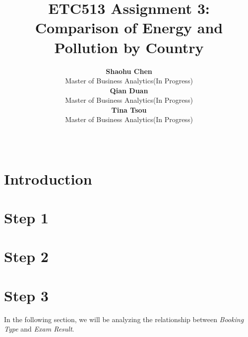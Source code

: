 \documentclass[11pt,a4paper,]{article}
\title{ETC513 Assignment 3: Comparison of Energy and Pollution by Country}
\author{\sf\Large\textbf{ Shaohu Chen}\\ {\sf\large Master of Business Analytics(In Progress)\\[0.5cm]} \sf\Large\textbf{ Qian Duan}\\ {\sf\large Master of Business Analytics(In Progress)\\[0.5cm]} \sf\Large\textbf{ Tina Tsou}\\ {\sf\large Master of Business Analytics(In Progress)\\[0.5cm]}}
\date{\sf\Date~\Month~\Year}
\makeatletter
\newenvironment{Shaded}{\begin{snugshade}}{\end{snugshade}}
\newcommand{\AttributeTok}[1]{\textcolor[rgb]{0.77,0.63,0.00}{#1}}
\newcommand{\ConstantTok}[1]{\textcolor[rgb]{0.00,0.00,0.00}{#1}}
\newcommand{\FunctionTok}[1]{\textcolor[rgb]{0.00,0.00,0.00}{#1}}
\newcommand{\NormalTok}[1]{#1}
\newcommand{\SpecialCharTok}[1]{\textcolor[rgb]{0.00,0.00,0.00}{#1}}
\newcommand{\StringTok}[1]{\textcolor[rgb]{0.31,0.60,0.02}{#1}}
\def\titlepage{\front{\expandafter{\@title}}{\@author}{\@organization}}
\makeatother
\begin{document}
\titlepage

\begin{Shaded}
\end{Shaded}

\section*{Introduction}

\section*{Step 1}

\section*{Step 2}

\section*{Step 3}

In the following section, we will be analyzing the relationship between \emph{Booking Type} and \emph{Exam Result}.
\end{document}
